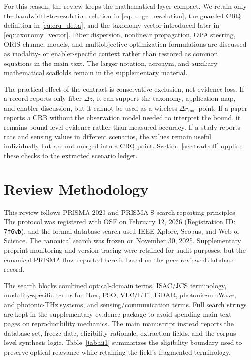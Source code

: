 \documentclass[letterpaper,journal]{IEEEtran}
\begin{document}
For this reason, the review keeps the mathematical layer compact. We retain only the bandwidth-to-resolution relation in \eqref{eq:range_resolution}, the guarded CRQ definition in \eqref{eq:crq_delta}, and the taxonomy vector introduced later in \eqref{eq:taxonomy_vector}. Fiber dispersion, nonlinear propagation, OPA steering, ORIS channel models, and multiobjective optimization formulations are discussed as modality- or enabler-specific context rather than restored as common equations in the main text. The larger notation, acronym, and auxiliary mathematical scaffolds remain in the supplementary material.

The practical effect of the contract is conservative exclusion, not evidence loss. If a record reports only fiber \(\Delta z\), it can support the taxonomy, application map, and enabler discussion, but it cannot be used as a wireless \(\Delta r_{\min}\) point. If a paper reports a CRB without the observation model needed to interpret the bound, it remains bound-level evidence rather than measured accuracy. If a study reports rate and sensing values in different scenarios, the values remain useful individually but are not merged into a CRQ point. Section~\ref{sec:tradeoff} applies these checks to the extracted scenario ledger.

\section{Review Methodology}
\label{sec:methodology}

This review follows PRISMA 2020 and PRISMA-S search-reporting principles. The protocol was registered with OSF on February 12, 2026 (Registration ID: \texttt{7f6wb}), and the formal database search used IEEE Xplore, Scopus, and Web of Science. The canonical search was frozen on November 30, 2025. Supplementary preprint monitoring and version tracing were retained for audit purposes, but the canonical PRISMA flow reported here is based on the peer-reviewed database record.

The search blocks combined optical-domain terms, ISAC/JCS terminology, modality-specific terms for fiber, FSO, VLC/LiFi, LiDAR, photonic-mmWave, and photonic-THz systems, and sensing/communication terms. Full search strings are kept in the supplementary evidence package to avoid spending main-text pages on reproducibility mechanics. The main manuscript instead reports the database set, freeze date, eligibility rationale, extraction fields, and the corpus-level synthesis logic.
Table~\ref{tab:iii1} summarizes the eligibility boundary used to preserve optical relevance while retaining the field's fragmented terminology.
\end{document}
